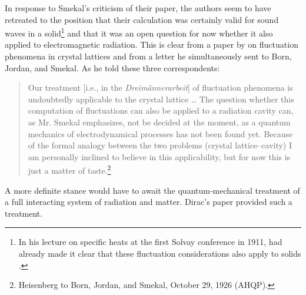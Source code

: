 \documentclass{elsart}
\begin{document}
In response to Smekal's criticism of their paper, the authors seem to have retreated to the position that their calculation was certainly valid for sound waves in a solid\footnote{In his lecture on specific heats at the first Solvay conference in 1911, \citet[p.\ 342]{Einstein 1914} had already made it clear that these fluctuation considerations also apply to solids \citep[p.\ 180]{Bach 1989}.} and that it was an open question for now whether it also applied to electromagnetic radiation. This is clear from a paper by \citet[p.\ 501, note 2]{Heisenberg 1926b} on fluctuation phenomena in crystal lattices and from a letter he simultaneously sent to Born, Jordan, and Smekal. As he told these three correspondents:
\begin{quotation}
Our treatment [i.e., in the {\it Dreim\"annerarbeit}] of fluctuation phenomena is undoubtedly applicable to the crystal lattice \ldots 
The question whether this computation of fluctuations can also be applied to a radiation cavity can, as Mr. Smekal emphasizes, not be decided at the moment, as a quantum mechanics of electrodynamical processes has not been found yet. Because of the formal analogy between the two problems (crystal lattice--cavity) I am personally inclined to believe in this applicability, but for now this is just a matter of taste.\footnote{Heisenberg to Born, Jordan, and Smekal, October 29, 1926 (AHQP).} 
\end{quotation}
A more definite stance would have to await the quantum-mechanical treatment of a full interacting system of radiation and matter. Dirac's paper provided such a treatment.
\end{document}
